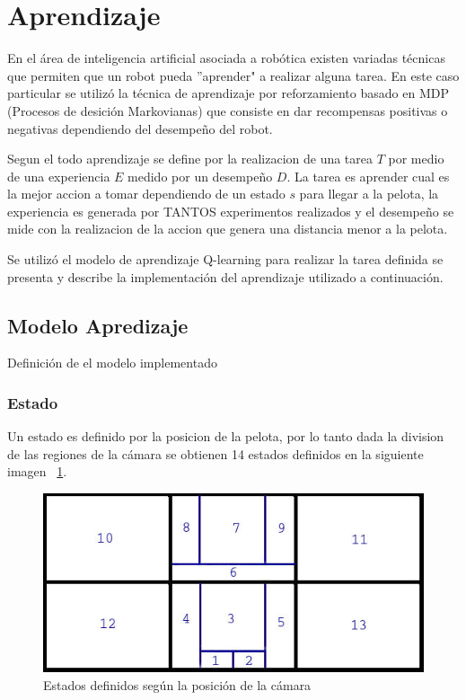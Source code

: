 
\section{Aprendizaje}\label{aprendizaje}
 
En el área de inteligencia artificial asociada a robótica existen variadas técnicas que permiten que un robot pueda ''aprender" a realizar alguna tarea. En este caso particular se utiliz\'o la técnica de aprendizaje por reforzamiento basado en MDP (Procesos de desici\'on Markovianas) que consiste en dar recompensas positivas o negativas dependiendo del desempeño del robot.


Segun el \cite{Mitchell} todo aprendizaje se define por la realizacion de una tarea $T$ por medio de una experiencia $E$ medido por un desempeño $D$. La tarea es aprender cual es la mejor accion a tomar dependiendo de un estado $s$ para llegar a la pelota, la experiencia es generada por TANTOS experimentos realizados y el desempeño se mide con la realizacion de la accion que genera una distancia menor a la pelota.

Se utilizó el modelo de aprendizaje Q-learning para realizar la tarea definida se presenta y describe la implementación del aprendizaje utilizado a continuación.

\subsection{Modelo Apredizaje}

Definici\'on de el modelo implementado

\subsubsection{Estado}

Un estado es definido por la posicion de la pelota, por lo tanto dada la division de las regiones de la c\'amara  se  obtienen 14 estados definidos en la siguiente imagen ~\ref{fig:estados}.

\begin{figure}[hbtp]
\centering
\includegraphics[scale=0.5]{imagenes/Regiones.jpg}
\caption{Estados definidos seg\'un la posici\'on de la c\'amara}
\label{fig:estados}
\end{figure}

